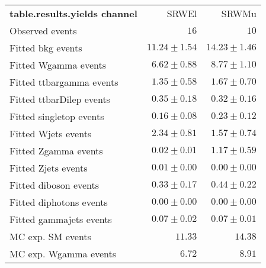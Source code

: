 

\begin{table}
\begin{center}
\setlength{\tabcolsep}{0.0pc}
{\small
\begin{tabular*}{\textwidth}{@{\extracolsep{\fill}}lrr}
\noalign{\smallskip}\hline\noalign{\smallskip}
{\bf table.results.yields channel}           & SRWEl            & SRWMu              \\[-0.05cm]
\noalign{\smallskip}\hline\noalign{\smallskip}
Observed events          & $16$              & $10$                    \\
\noalign{\smallskip}\hline\noalign{\smallskip}
Fitted bkg events         & $11.24 \pm 1.54$          & $14.23 \pm 1.46$              \\
\noalign{\smallskip}\hline\noalign{\smallskip}
        Fitted Wgamma events         & $6.62 \pm 0.88$          & $8.77 \pm 1.10$              \\
        Fitted ttbargamma events         & $1.35 \pm 0.58$          & $1.67 \pm 0.70$              \\
        Fitted ttbarDilep events         & $0.35 \pm 0.18$          & $0.32 \pm 0.16$              \\
        Fitted singletop events         & $0.16 \pm 0.08$          & $0.23 \pm 0.12$              \\
        Fitted Wjets events         & $2.34 \pm 0.81$          & $1.57 \pm 0.74$              \\
        Fitted Zgamma events         & $0.02 \pm 0.01$          & $1.17 \pm 0.59$              \\
        Fitted Zjets events         & $0.01 \pm 0.00$          & $0.00 \pm 0.00$              \\
        Fitted diboson events         & $0.33 \pm 0.17$          & $0.44 \pm 0.22$              \\
        Fitted diphotons events         & $0.00 \pm 0.00$          & $0.00 \pm 0.00$              \\
        Fitted gammajets events         & $0.07 \pm 0.02$          & $0.07 \pm 0.01$              \\
 \noalign{\smallskip}\hline\noalign{\smallskip}
MC exp. SM events              & $11.33$          & $14.38$              \\
\noalign{\smallskip}\hline\noalign{\smallskip}
        MC exp. Wgamma events         & $6.72$          & $8.91$              \\

\end{tabular*}}
\end{center}
\end{table}
